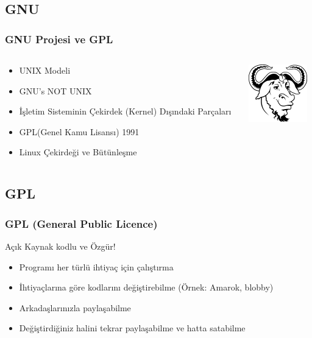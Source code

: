 \documentclass{beamer}
\begin{document}
	\subsection{GNU}
		\begin{frame}
		 	\frametitle{GNU Projesi ve GPL}
			\begin{columns}
			\begin{column}[l]{5cm}
				\begin{itemize}[<+->]
					\item UNIX Modeli
					\item GNU's NOT UNIX
					\item İşletim Sisteminin Çekirdek (Kernel) Dışındaki Parçaları
					\item GPL(Genel Kamu Lisansı) 1991
					\item Linux Çekirdeği ve Bütünleşme
				\end{itemize}
			\end{column}
			\begin{column}[r]{5cm}		
				\includegraphics{gnukucuk.jpg}
			\end{column}
			\end{columns}


		\end{frame}
	\subsection{GPL}
		\begin{frame}
		 	\frametitle{GPL (General Public Licence)}
			Açık Kaynak kodlu ve Özgür!
			\begin{itemize}
			 \item Programı her türlü ihtiyaç için çalıştırma
			 \item İhtiyaçlarına göre kodlarını değiştirebilme (Örnek: Amarok, blobby)
			 \item Arkadaşlarınızla paylaşabilme
			 \item Değiştirdiğiniz halini tekrar paylaşabilme ve hatta satabilme
			\end{itemize}

		\end{frame}
\end{document}
